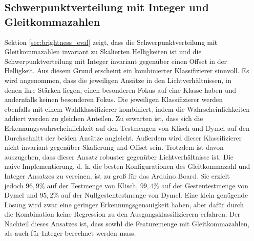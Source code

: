 \subsection{Schwerpunktverteilung mit Integer und Gleitkommazahlen}
Sektion \ref{sec:brightness_eval} zeigt, dass die Schwerpunktverteilung mit Gleitkommazahlen invariant zu Skalierten Helligkeiten ist und die Schwerpunktverteilung mit Integer invariant
gegenüber einen Offset in der Helligkeit. Aus diesem Grund erscheint ein kombinierter Klassifizierer sinnvoll. Es wird angenommen, dass die jeweiligen Ansätze in den Lichtverhältnissen, in denen ihre
Stärken liegen, einen besonderen Fokus auf eine Klasse haben und andernfalls keinen besonderen Fokus.
\newline
\newline
Die jeweiligen Klassifizierer werden ebenfalls mit einem Wahlklassifizierer kombiniert, indem die Wahrscheinlichkeiten addiert werden zu gleichen Anteilen. Zu erwarten ist, dass sich die
Erkennungswahrscheinlichkeit auf den Testmengen von Klisch und Dymel auf den Durchschnitt der beiden Ansätze angleicht.
Außerdem wird dieser Klassifizierer nicht invariant gegenüber Skalierung und Offset sein. Trotzdem ist davon auszugehen, dass dieser Ansatz robuster gegenüber Lichtverhältnisse ist.
\newline
\newline
Die naive Implementierung, d. h. die besten Konfigurationen des Gleitkommazahl und Integer Ansatzes zu vereinen, ist zu groß für das Arduino Board. Sie erzielt jedoch $96,9\%$ auf der Testmenge
von Klisch, $99,4\%$ auf der Gestentestmenge von Dymel und $95,2\%$ auf der Nullgestentestmenge von Dymel. Eine klein genügende Lösung wird zwar eine geringer Erkennungsgenauigkeit haben, aber dafür
durch die Kombination keine Regression zu den Ausgangsklassifizierern erfahren.
\newline
\newline
Der Nachteil dieses Ansatzes ist, dass sowhl die Featuremenge mit Gleitkommazahlen, als auch für Integer berechnet werden muss.
